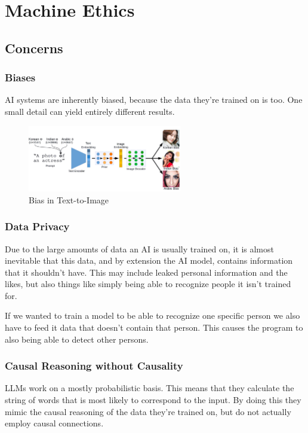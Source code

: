 \documentclass[
../../EiKI_Summary.tex,
]
{subfiles}
\begin{document}
\section{Machine Ethics}
\subsection{Concerns}
\subsubsection{Biases}
AI systems are inherently biased, because the data they're trained on is too. One small detail can yield entirely different results.

\begin{figure}
    [H]
    \centering
    \includegraphics[width=0.6\textwidth]{Pics/10/BiasExample.png}
    \caption{Bias in Text-to-Image}
\end{figure}

\subsubsection{Data Privacy}
Due to the large amounts of data an AI is usually trained on, it is almost inevitable that this data, and by extension the AI model, contains information that it shouldn't have. This may include leaked personal information and the likes, but also things like simply being able to recognize people it isn't trained for. 

If we wanted to train a model to be able to recognize one specific person we also have to feed it data that doesn't contain that person. This causes the program to also being able to detect other persons.

\subsubsection{Causal Reasoning without Causality}
LLMs work on a mostly probabilistic basis. This means that they calculate the string of words that is most likely to correspond to the input. By doing this they mimic the causal reasoning of the data they're trained on, but do not actually employ causal connections. 
\end{document}
